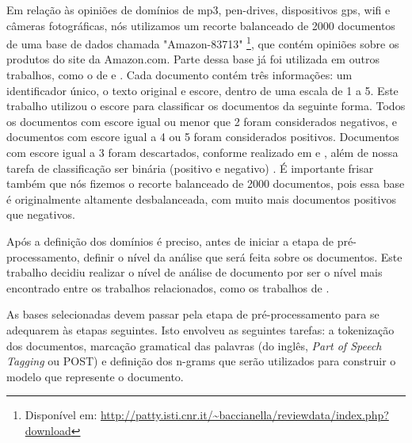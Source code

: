\documentclass[template.tex]{subfiles}
\begin{document}
Em relação às opiniões de domínios de mp3, pen-drives, dispositivos gps, wifi e câmeras fotográficas, nós utilizamos um recorte balanceado de 2000 documentos de uma base de dados chamada  "Amazon-83713" \footnote{Disponível em: \url{http://patty.isti.cnr.it/~baccianella/reviewdata/index.php?download}}, que contém opiniões sobre os produtos do site da Amazon.com. Parte dessa base já foi utilizada em outros trabalhos, como o de  e . Cada documento contém três informações: um identificador único, o texto original e escore, dentro de uma escala de 1 a 5. Este trabalho utilizou o escore para classificar os documentos da seguinte forma. Todos os documentos com escore igual ou menor que 2 foram considerados negativos, e documentos com escore igual a 4 ou 5 foram considerados positivos. Documentos com escore igual a 3 foram descartados, conforme realizado em \cite{khan2011sentiment} e  \cite{pang2004sentimental}, além de nossa tarefa de classificação ser binária (positivo e negativo) . É importante frisar também que nós fizemos o recorte balanceado de 2000 documentos, pois essa base é originalmente altamente desbalanceada, com muito mais documentos positivos que negativos.  


Após a definição dos domínios é preciso, antes de iniciar a etapa de pré-processamento, definir o nível da análise que será feita sobre os documentos. Este trabalho decidiu realizar o nível de análise de documento por ser o nível mais encontrado entre os trabalhos relacionados, como os trabalhos de . 

As bases selecionadas devem passar pela etapa de pré-processamento para se adequarem às etapas seguintes. Isto envolveu as seguintes tarefas: a tokenização dos documentos, marcação gramatical das palavras (do inglês, \textit{Part of Speech Tagging} ou POST) e definição dos n-grams que serão utilizados para construir o modelo que represente o documento. 
\end{document}
